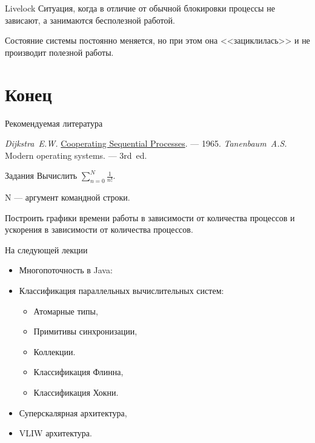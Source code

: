 \begin{frame}{Livelock}
Ситуация, когда в отличие от обычной блокировки процессы не зависают, а занимаются бесполезной работой.
\vspace*{0.5cm}

Состояние системы постоянно меняется, но при этом она <<зациклилась>> и не производит полезной работы.
\end{frame}

\section*{Конец}

\begin{frame}[allowframebreaks]{Рекомендуемая литература}
\begin{thebibliography}{99}
    \bibitem{} \textit{Dijkstra~E.W.}
    \href{http://www.cs.utexas.edu/users/EWD/transcriptions/EWD01xx/EWD123.html}{Cooperating
    Sequential Processes}. --- 1965.
    \bibitem{} \textit{Tanenbaum~A.S.} Modern operating systems. --- 3rd~ed.
\end{thebibliography}
\end{frame}

\ifmipt
\begin{frame}{Задания}
Вычислить $\sum \limits_{n=0}^{N} \frac{1}{n!}$.

N --- аргумент командной строки.

Построить графики времени работы в зависимости от количества процессов и ускорения в зависимости от количества процессов.
\end{frame}
\fi

\begin{frame}{На следующей лекции}
\begin{itemize}
\ifsbertech
    \item Многопоточность в Java:
\fi
\ifmipt
    \item Классификация параллельных вычислительных систем:
\fi
    \begin{itemize}
\ifsbertech
        \item Атомарные типы,
        \item Примитивы синхронизации,
        \item Коллекции.
\fi
\ifmipt
        \item Классификация Флинна,
        \item Классификация Хокни.
\fi
    \end{itemize}
\ifmipt
    \item Суперскалярная архитектура,
    \item VLIW архитектура.
\fi
\end{itemize}
\end{frame}

